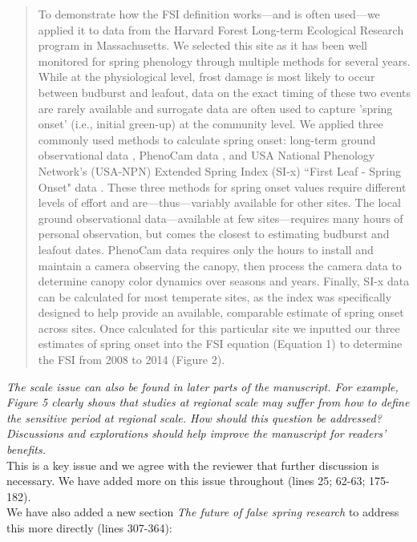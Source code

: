 \documentclass[11pt,a4paper]{article}
\begin{document}
\begin{quotation}
To demonstrate how the FSI definition works---and is often used---we applied it to data from the Harvard Forest Long-term Ecological Research program in Massachusetts. We selected this site as it has been well monitored for spring phenology through multiple methods for several years. While at the physiological level, frost damage is most likely to occur between budburst and leafout, data on the exact timing of these two events are rarely available and surrogate data are often used to capture 'spring onset' (i.e., initial green-up) at the community level. We applied three commonly used methods to calculate spring onset: long-term ground observational data \citep{Okeefe2014}, PhenoCam data \citep{Richardson2015}, and USA National Phenology Network's (USA-NPN) Extended Spring Index (SI-x) ``First Leaf - Spring Onset" data \citep{USA-NPN2016}. These three methods for spring onset values require different levels of effort and are---thus---variably available for other sites. The local ground observational data---available at few sites---requires many hours of personal observation, but comes the closest to estimating budburst and leafout dates. PhenoCam data requires only the hours to install and maintain a camera observing the canopy, then process the camera data to determine canopy color dynamics over seasons and years. Finally, SI-x data can be calculated for most temperate sites, as the index was specifically designed to help provide an available, comparable estimate of spring onset across sites. Once calculated for this particular site we inputted our three estimates of spring onset into the FSI equation (Equation 1) to determine the FSI from 2008 to 2014 (Figure 2). 
\end{quotation}


\textit{The scale issue can also be found in later parts of the manuscript. For example, Figure 5 clearly shows that studies at regional scale may suffer from how to define the sensitive period at regional scale. How should this question be addressed? Discussions and explorations should help improve the manuscript for readers' benefits.} \\

This is a key issue and we agree with the reviewer that further discussion is necessary. We have added more on this issue throughout (lines 25; 62-63; 175-182). \\

We have also added a new section \textit{The future of false spring research} to address this more directly (lines 307-364):\\ %
\end{document}
